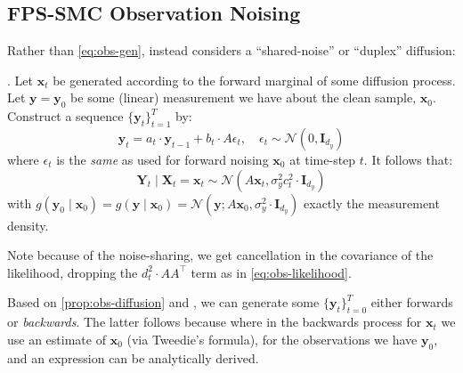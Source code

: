 \subsection{FPS-SMC Observation Noising}

Rather than \autoref{eq:obs-gen}, \textcite{douDiffusionPosteriorSampling2023} instead considers
a ``shared-noise'' or ``duplex'' diffusion:

\begin{proposition} \label{prop:obs-diffusion}
    \textcite[Proposition B.1]{douDiffusionPosteriorSampling2023}.
    Let $\mathbf{x}_t$ be generated according to the forward marginal of some diffusion process.
    Let $\mathbf{y} = \mathbf{y}_0$ be some (linear) measurement we have about the clean sample,
    $\mathbf{x}_0$. Construct a sequence $\{\mathbf{y}_t\}_{t=1}^T$ by:
    \begin{equation*}
        \mathbf{y}_t = a_t\cdot \mathbf{y}_{t-1} + b_t\cdot A\epsilon_t,\quad \epsilon_t \sim \mathcal{N}(0, \mathbf{I}_{d_y})
    \end{equation*}
    where $\epsilon_t$ is the \emph{same} as used for forward noising $\mathbf{x}_0$ at time-step $t$.
    It follows that:
    \begin{equation}
        \mathbf{Y}_t \mid \mathbf{X}_t = \mathbf{x}_t \sim \mathcal{N}(A\mathbf{x}_t, \sigma_y^2c_t^2\cdot \mathbf{I}_{d_y}) \label{eq:obs-likelihood-dou}
    \end{equation}
    with $g(\mathbf{y}_0 \mid \mathbf{x}_0) = g(\mathbf{y} \mid \mathbf{x}_0) = \mathcal{N}(\mathbf{y}; A\mathbf{x}_0, \sigma_y^2\cdot \mathbf{I}_{d_y})$
    exactly the measurement density.
\end{proposition}

Note because of the noise-sharing, we get cancellation in the covariance of the likelihood, dropping
the $d_t^2\cdot AA^\top$ term as in \autoref{eq:obs-likelihood}.

Based on \autoref{prop:obs-diffusion} and \textcite[Remark B.1]{douDiffusionPosteriorSampling2023},
we can generate some $\{\mathbf{y}_t\}_{t=0}^T$ either forwards or \emph{backwards}.
The latter follows because where in the backwards process for $\mathbf{x}_t$ we use an estimate of
$\mathbf{x}_0$ (via Tweedie's formula), for the observations we have $\mathbf{y}_0$, and an
expression can be analytically derived.

